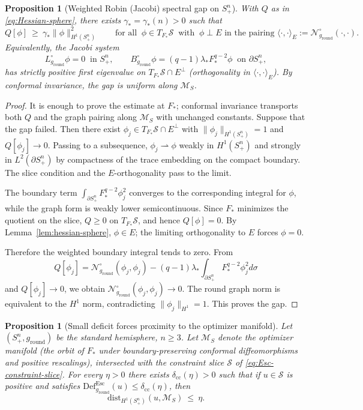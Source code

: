 \documentclass[11pt,reqno,a4paper]{amsart}
\numberwithin{equation}{section}
\newcommand{\Def}{\mathrm{Def}}
\theoremstyle{plain}
\newtheorem{proposition}[theorem]{Proposition}
\theoremstyle{remark}
\theoremstyle{plain}
\begin{document}
\begin{proposition}[Weighted Robin (Jacobi) spectral gap on $S^n_+$]\label{prop:robin-gap}
With $Q$ as in \eqref{eq:Hessian-sphere}, there exists $\gamma_\ast=\gamma_\ast(n)>0$ such that
\[
  Q[\phi]\ \ge\ \gamma_\ast\|\phi\|_{H^1(S^n_+)}^{2}
  \qquad\text{for all }\ \phi\in T_{F_\ast}\mathcal S\ \text{ with }\ \phi\perp E
  \text{ in the pairing } \langle\cdot,\cdot\rangle_{E}:=\mathcal N^\circ_{g_{\mathrm{round}}}(\cdot,\cdot).
\]
Equivalently, the Jacobi system
\[
  L_{g_{\mathrm{round}}}^\circ\phi=0\ \text{ in } S^n_+,
  \qquad
  B_{g_{\mathrm{round}}}^\circ\phi=(q-1)\lambda_\ast F_\ast^{q-2}\phi\ \text{ on } \partial S^n_+,
\]
has strictly positive first eigenvalue on $T_{F_\ast}\mathcal S\cap E^\perp$ (orthogonality in $\langle\cdot,\cdot\rangle_{E}$). By conformal invariance, the gap is uniform along $\mathcal M_S$.
\end{proposition}
\begin{proof}
It is enough to prove the estimate at $F_\ast$; conformal invariance transports both
$Q$ and the graph pairing along $\mathcal M_S$ with unchanged constants.  Suppose that the
gap failed.  Then there exist
$\phi_j\in T_{F_\ast}\mathcal S\cap E^\perp$ with
$\|\phi_j\|_{H^1(S^n_+)}=1$ and $Q[\phi_j]\to0$.
Passing to a subsequence,
$\phi_j\rightharpoonup\phi$ weakly in $H^1(S^n_+)$ and strongly in
$L^2(\partial S^n_+)$ by compactness of the trace embedding on the compact boundary.
The slice condition and the $E$-orthogonality pass to the limit.

The boundary term
$\int_{\partial S^n_+}F_\ast^{q-2}\phi_j^2$ converges to the corresponding integral for
$\phi$, while the graph form is weakly lower semicontinuous.  Since $F_\ast$ minimizes the
quotient on the slice, $Q\ge0$ on $T_{F_\ast}\mathcal S$, and hence $Q[\phi]=0$.
By Lemma~\ref{lem:hessian-sphere}, $\phi\in E$; the limiting orthogonality to $E$ forces
$\phi=0$.

Therefore the weighted boundary integral tends to zero.  From
\[
Q[\phi_j]
=\mathcal N^\circ_{g_{\mathrm{round}}}(\phi_j,\phi_j)
-(q-1)\lambda_\ast\int_{\partial S^n_+}F_\ast^{q-2}\phi_j^2d\sigma
\]
and $Q[\phi_j]\to0$, we obtain
$\mathcal N^\circ_{g_{\mathrm{round}}}(\phi_j,\phi_j)\to0$.  The round graph norm is
equivalent to the $H^1$ norm, contradicting $\|\phi_j\|_{H^1}=1$.  This proves the gap.
\end{proof}

\begin{proposition}[Small deficit forces proximity to the optimizer manifold]
\label{prop:deficit-to-proximity}
Let $(S^n_+,g_{\mathrm{round}})$ be the standard hemisphere, $n\ge3$.
Let $\mathcal M_S$ denote the optimizer manifold (the orbit of
$F_\ast$ under boundary-preserving conformal diffeomorphisms and
positive rescalings), intersected with the constraint slice
$\mathcal S$ of \eqref{eq:Esc-constraint-slice}.
For every $\eta>0$ there exists $\delta_{\mathrm{cc}}(\eta)>0$ such that
if $u\in\mathcal S$ is \emph{positive} and satisfies
$\Def^{\mathrm{Esc}}_{g_{\mathrm{round}}}(u)\le\delta_{\mathrm{cc}}(\eta)$, then
\[
  \mathrm{dist}_{H^1(S^n_+)}(u,\mathcal M_S)\ \le\ \eta.
\]
\end{proposition}
\end{document}
